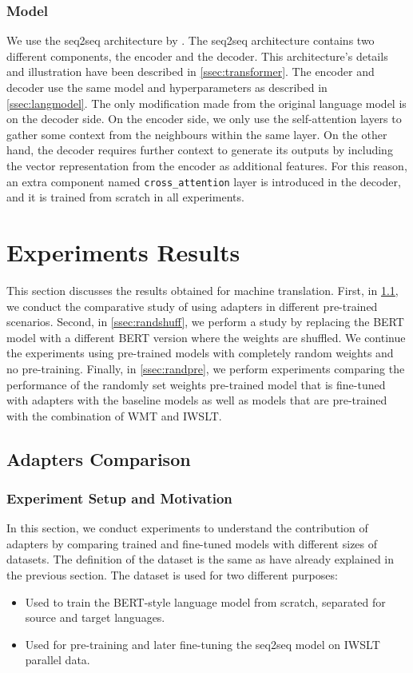 \subsubsection{Model}
We use the seq2seq architecture by \cite{vaswani2017attention}. The seq2seq architecture contains two different components, the encoder and the decoder. This architecture's details and illustration have been described in \cref{ssec:transformer}. The encoder and decoder use the same model and hyperparameters as described in \cref{ssec:langmodel}. The only modification made from the original language model is on the decoder side. On the encoder side, we only use the self-attention layers to gather some context from the neighbours within the same layer. On the other hand, the decoder requires further context to generate its outputs by including the vector representation from the encoder as additional features. For this reason, an extra component named \texttt{cross\_attention} layer is introduced in the decoder, and it is trained from scratch in all experiments.

\section{Experiments Results}
This section discusses the results obtained for machine translation. First, in \cref{ssec:adaptcomp}, we conduct the comparative study of using adapters in different pre-trained scenarios. Second, in \cref{ssec:randshuff}, we perform a study by replacing the BERT model with a different BERT version where the weights are shuffled. We continue the experiments using pre-trained models with completely random weights and no pre-training. Finally, in \cref{ssec:randpre}, we perform experiments comparing the performance of the randomly set weights pre-trained model that is fine-tuned with adapters with the baseline models as well as models that are pre-trained with the combination of WMT and IWSLT.

\subsection{Adapters Comparison}
\label{ssec:adaptcomp}
\subsubsection{Experiment Setup and Motivation}
In this section, we conduct experiments to understand the contribution of adapt\-ers by comparing trained and fine-tuned models with different sizes of datasets. The definition of the dataset is the same as have already explained in the previous section. The dataset is used for two different purposes:
\begin{itemize}
    \item Used to train the BERT-style language model from scratch, separated for source and target languages.
    \item Used for pre-training and later fine-tuning the seq2seq model on IWSLT parallel data.
\end{itemize}

